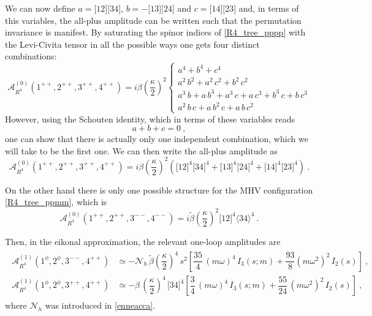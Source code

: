\documentclass[a4paper,11pt]{article}
\numberwithin{equation}{section}
\newcommand{\agl}[2]{\langle#1 #2 \rangle}
\newcommand{\sqr}[2]{\lbrack #1 #2 \rbrack}
\newcommand{\cA}{\mathcal{A}}
\newcommand{\cN}{\mathcal{N}}
\def\cA{\mathcal{A}}
\begin{document}
We can now define $a = \sqr{1}{2}\sqr{3}{4}$, $b=-\sqr{1}{3}\sqr{2}{4}$ and $c= \sqr{1}{4}\sqr{2}{3}$ and, in terms of this variables, the all-plus amplitude can be written such that the permutation invariance is manifest. By saturating the spinor indices of \eqref{R4_tree_pppp} with the Levi-Civita tensor in all the possible ways one gets four distinct combinations:
\begin{equation}
    \cA_{R^4}^{(0)} (1^{++},2^{++},3^{++},4^{++}) = i \beta \left( \frac{\kappa}{2} \right)^2
        \begin{cases}
            a^4 + b^4 + c^4\\[.1em]
            a^2\, b^2 + a^2\, c^2 + b^2\, c^2\\[.1em]
            a^3\, b + a\, b^3 + a^3\, c + a\, c^3 + b^3\, c + b\, c^3\\[.1em]
            a^2\, b\, c + a\, b^2\, c + a\, b\, c^2 
        \end{cases}
\end{equation}
However, using the Schouten identity, which in terms of these variables reads
\begin{equation}
    a+b+c=0\ ,
\end{equation}
one can show that there is actually only one independent combination, which we will take to be the first one. We can then write the all-plus amplitude as
\begin{equation}
    \cA_{R^4}^{(0)} (1^{++},2^{++},3^{++},4^{++}) = i \beta \left( \frac{\kappa}{2} \right)^2 \left( \sqr{1}{2}^4 \sqr{3}{4}^4 + \sqr{1}{3}^4 \sqr{2}{4}^4 + \sqr{1}{4}^4 \sqr{2}{3}^4 \right) \ .
\end{equation}

On the other hand there is only one possible structure for the MHV configuration \eqref{R4_tree_ppmm}, which is
\begin{equation}
    \cA_{R^4}^{(0)} (1^{++},2^{++},3^{--},4^{--}) = i \widetilde{\beta} \left( \frac{\kappa}{2} \right)^2 \sqr{1}{2}^4 \agl{3}{4}^4
    \ .
\end{equation}

Then, in the eikonal approximation, the relevant one-loop amplitudes are
\begin{align}
\begin{split}
\label{am1}
\mathcal{A}^{(1)}_{R^4}  (1^\phi, 2^\phi, 3^{--}, 4^{++})  &\simeq  -  \cN_h\, \widetilde{\beta} \left( \dfrac{\kappa}{2}\right)^4 \, s^2 \left[ \dfrac{35}{4} \, ( m \omega)^4 \, I_3 (s;m) + \dfrac{93}{8}  (m \omega^2)^2 \, I_2 (s) \right] 
\ ,
\\
 \mathcal{A}^{(1)}_{R^4}  (1^\phi, 2^\phi, 3^{++}, 4^{++})  &\simeq -  \beta\,\left( \dfrac{\kappa}{2}\right)^4 \,\sqr{3}{4}^4 \left[ 
     \dfrac{3}{4} \, (m \omega)^4 
     \, I_3 (s;m) \right. 
	+\left. \dfrac{55}{24}  \, (m\omega^2)^2 \, I_2 (s) \right] \ , 
\end{split}
\end{align}
where $\cN_h$ was introduced in \eqref{enneacca}.
\end{document}
